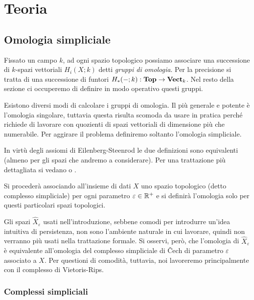 \chapter{Teoria}\label{ch:teoria}

\section{Omologia simpliciale}

\begin{sloppypar}
  Fissato un campo $k$, ad ogni spazio topologico possiamo associare una successione di $k$-spazi vettoriali $H_i(X;k)$ detti \emph{gruppi di omologia}. Per la precisione si tratta di una successione di funtori ${H_*(-;k):\mathbf{Top} \to \mathbf{Vect}_k}$. Nel resto della sezione ci occuperemo di definire in modo operativo questi gruppi.
\end{sloppypar}

Esistono diversi modi di calcolare i gruppi di omologia. Il più generale e potente è l'omologia singolare, tuttavia questa risulta scomoda da usare in pratica perché richiede di lavorare con quozienti di spazi vettoriali di dimensione più che numerabile. Per aggirare il problema definiremo soltanto l'omologia simpliciale.

In virtù degli assiomi di Eilenberg-Steenrod \cite{Eilenberg1945, Eilenberg} le due definizioni sono equivalenti (almeno per gli spazi che andremo a considerare). Per una trattazione più dettagliata si vedano \cite{Hatcher2015} o \cite{Rotman1988}.

Si procederà associando all'insieme di dati $X$ uno spazio topologico (detto complesso simpliciale) per ogni parametro $\varepsilon \in \mathbb{R}^+$ e si definirà l'omologia solo per questi particolari spazi topologici.

Gli spazi $\widehat{X}_\varepsilon$ usati nell'introduzione, sebbene comodi per introdurre un'idea intuitiva di persistenza, non sono l'ambiente naturale in cui lavorare, quindi non verranno più usati nella trattazione formale. Si osservi, però, che l'omologia di $\widehat{X}_\varepsilon$ è equivalente all'omologia del complesso simpliciale di \v{C}ech di parametro $\varepsilon$ associato a $X$. Per questioni di comodità, tuttavia, noi lavoreremo principalmente con il complesso di Vietoris-Rips.

\subsection{Complessi simpliciali}

